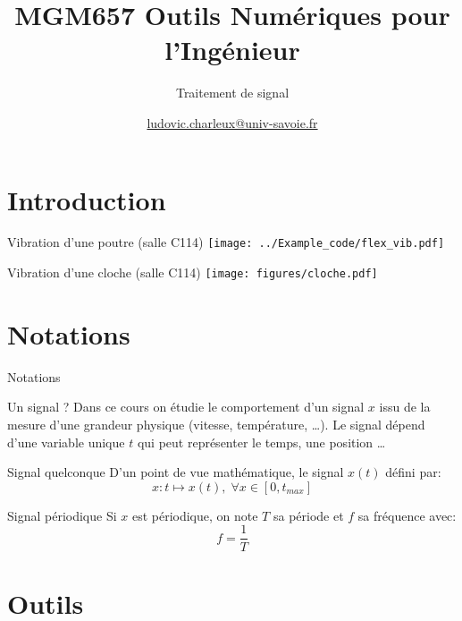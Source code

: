 \documentclass[8pt,a4paper]{beamer}
\author[LC]{\href{mailto:ludovic.charleux@univ-savoie.fr}{ludovic.charleux@univ-savoie.fr}}
\title{MGM657 Outils Numériques pour l'Ingénieur}
\subtitle{Traitement de signal}
\date{}
\institute{\url{www.polytech.univ-savoie.fr}}
\begin{document}
\begin{frame}[plain]
\titlepage
\tableofcontents
\end{frame}

\section{Introduction}

\begin{frame}{Vibration d'une poutre (salle C114)}
\texttt{[image: ../Example\_code/flex\_vib.pdf]}
\end{frame}

\begin{frame}{Vibration d'une cloche (salle C114)}
\texttt{[image: figures/cloche.pdf]}
\end{frame}


\section{Notations}
\begin{frame}{Notations}
\begin{block}{Un signal ?}
Dans ce cours on étudie le comportement d'un signal $x$ issu de la mesure d'une grandeur physique (vitesse, température, \ldots). Le signal dépend d'une variable unique $t$ qui peut représenter le temps, une position \ldots 
\end{block}

\begin{block}{Signal quelconque}
D'un point de vue mathématique, le signal $x(t)$ défini par:
$$
x:t \longmapsto x(t), \; \forall x \in [0,t_{max}]
$$

\end{block}

\begin{block}{Signal périodique}
Si $x$ est périodique, on note $T$ sa période et $f$ sa fréquence avec:
$$
f = \frac{1}{T}
$$
\end{block}
\end{frame}

\section{Outils}
\end{document}
